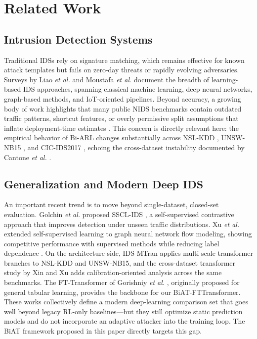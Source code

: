 \section{Related Work}
\label{sec:related_work}

\subsection{Intrusion Detection Systems}

Traditional IDSs rely on signature matching, which remains effective for known attack templates but fails on zero-day threats or rapidly evolving adversaries. Surveys by Liao \emph{et al.} \cite{liao2024survey} and Moustafa \emph{et al.} \cite{moustafa2023explainable} document the breadth of learning-based IDS approaches, spanning classical machine learning, deep neural networks, graph-based methods, and IoT-oriented pipelines. Beyond accuracy, a growing body of work highlights that many public NIDS benchmarks contain outdated traffic patterns, shortcut features, or overly permissive split assumptions that inflate deployment-time estimates \cite{datasetreview2025, ring2019nids}. This concern is directly relevant here: the empirical behavior of Bi-ARL changes substantially across NSL-KDD \cite{tavallaee2009nslkdd}, UNSW-NB15 \cite{moustafa2015unswnb15}, and CIC-IDS2017 \cite{sharafaldin2018cicids2017}, echoing the cross-dataset instability documented by Cantone \emph{et al.} \cite{cantone2024crossdataset}.

\subsection{Generalization and Modern Deep IDS}

An important recent trend is to move beyond single-dataset, closed-set evaluation. Golchin \emph{et al.} proposed SSCL-IDS \cite{golchin2024ssclids}, a self-supervised contrastive approach that improves detection under unseen traffic distributions. Xu \emph{et al.} extended self-supervised learning to graph neural network flow modeling, showing competitive performance with supervised methods while reducing label dependence \cite{xu2024gnnssl}. On the architecture side, IDS-MTran \cite{xi2024idsmtran} applies multi-scale transformer branches to NSL-KDD and UNSW-NB15, and the cross-dataset transformer study by Xin and Xu \cite{xin2025crossdatasettransformer} adds calibration-oriented analysis across the same benchmarks. The FT-Transformer of Gorishniy \emph{et al.} \cite{gorishniy2021fttransformer}, originally proposed for general tabular learning, provides the backbone for our BiAT-FTTransformer. These works collectively define a modern deep-learning comparison set that goes well beyond legacy RL-only baselines---but they still optimize static prediction models and do not incorporate an adaptive attacker into the training loop. The BiAT framework proposed in this paper directly targets this gap.

